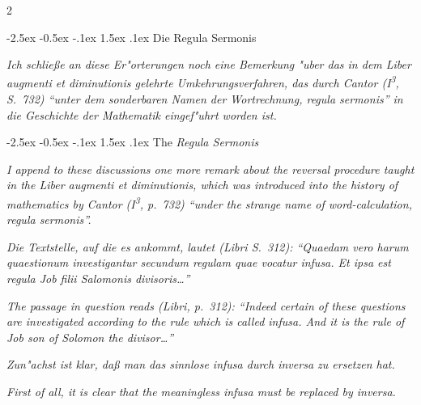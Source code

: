 \documentclass[10pt,a4paper]{article}
\makeatletter
\newcommand{\enquote}[1]{``#1''}
\renewcommand{\section}{\@startsection{section}{1}{\z@}%
  {-2.5ex \@plus -0.5ex \@minus -.1ex}%
  {1.5ex \@plus .1ex}%
  {\normalfont\large\bfseries\color{sectioncolor}}}
\makeatother
\begin{document}
\begin{paracol}{2}

\section{Die Regula Sermonis}

\textit{Ich schlie\ss{}e an diese Er"orterungen noch eine Bemerkung "uber das in dem \textit{Liber augmenti et diminutionis} gelehrte Umkehrungsverfahren, das durch Cantor (I\textsuperscript{3}, S.\ 732) \enquote{unter dem sonderbaren Namen der Wortrechnung, \textit{regula sermonis}} in die Geschichte der Mathematik eingef"uhrt worden ist.}

\switchcolumn

\section{The \textit{Regula Sermonis}}

\textit{I append to these discussions one more remark about the reversal procedure taught in the \textit{Liber augmenti et diminutionis}, which was introduced into the history of mathematics by Cantor (I\textsuperscript{3}, p.\ 732) \enquote{under the strange name of word-calculation, \textit{regula sermonis}}.}

\switchcolumn*

\textit{Die Textstelle, auf die es ankommt, lautet (Libri S.\ 312): \enquote{\textit{Quaedam vero harum quaestionum investigantur secundum regulam quae vocatur infusa. Et ipsa est regula Job filii Salomonis divisoris\ldots{}}}}

\switchcolumn

\textit{The passage in question reads (Libri, p.\ 312): \enquote{\textit{Indeed certain of these questions are investigated according to the rule which is called infusa. And it is the rule of Job son of Solomon the divisor\ldots{}}}}

\switchcolumn*

\textit{Zun"achst ist klar, da\ss{} man das sinnlose \textit{infusa} durch \textit{inversa} zu ersetzen hat.}

\switchcolumn

\textit{First of all, it is clear that the meaningless \textit{infusa} must be replaced by \textit{inversa}.}

\switchcolumn*


\end{paracol}
\end{document}

